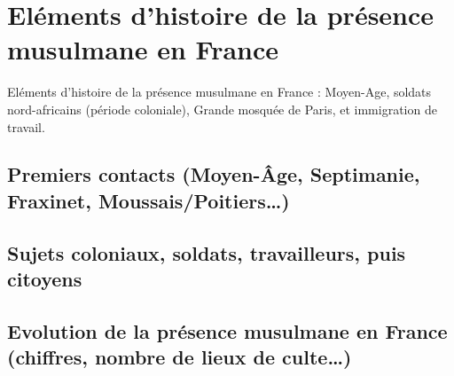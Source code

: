 \chapter{Eléments d’histoire de la présence musulmane en France}

Eléments d’histoire de la présence musulmane en France : Moyen-Age, soldats
nord-africains (période coloniale), Grande mosquée de Paris, et immigration de
travail.


\section{Premiers contacts (Moyen-Âge, Septimanie, Fraxinet, Moussais/Poitiers…)}

\section{Sujets coloniaux, soldats, travailleurs, puis citoyens}



\section{Evolution de la présence musulmane en France (chiffres, nombre de lieux de
culte…)}

